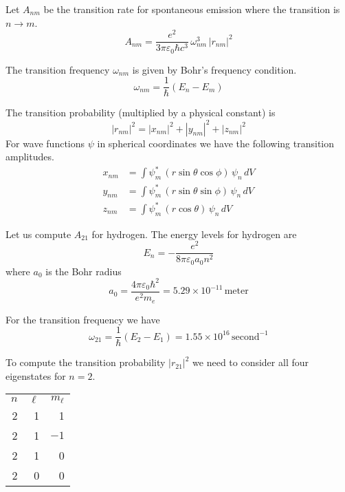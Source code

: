 \documentclass[12pt]{article}
\begin{document}
\noindent
Let $A_{nm}$ be the transition rate for spontaneous emission where the transition is $n\rightarrow m$.
\begin{equation*}
A_{nm}=\frac{e^2}{3\pi\varepsilon_0\hbar c^3}\,\omega_{nm}^3\,|r_{nm}|^2
\end{equation*}

\noindent
The transition frequency $\omega_{nm}$ is given by Bohr's frequency condition.
\begin{equation*}
\omega_{nm}=\frac{1}{\hbar}(E_n-E_m)
\end{equation*}

\noindent
The transition probability (multiplied by a physical constant) is
\begin{equation*}
|r_{nm}|^2
=|x_{nm}|^2
+|y_{nm}|^2
+|z_{nm}|^2
\end{equation*}
For wave functions $\psi$ in spherical coordinates we have the following transition amplitudes.
\begin{align*}
x_{nm}&=\int\psi_m^*\,(r\sin\theta\cos\phi)\,\psi_n\,dV
\\
y_{nm}&=\int\psi_m^*\,(r\sin\theta\sin\phi)\,\psi_n\,dV
\\
z_{nm}&=\int\psi_m^*\,(r\cos\theta)\,\psi_n\,dV
\end{align*}

\noindent
Let us compute $A_{21}$ for hydrogen.
The energy levels for hydrogen are
\begin{equation*}
E_n=-\frac{e^2}{8\pi\varepsilon_0 a_0n^2}
\end{equation*}
where $a_0$ is the Bohr radius
\begin{equation*}
a_0=\frac{4\pi\varepsilon_0\hbar^2}{e^2 m_e}
=5.29\times10^{-11}\,\text{meter}
\end{equation*}

\noindent
For the transition frequency we have
\begin{equation*}
\omega_{21}=\frac{1}{\hbar}(E_2-E_1)
=1.55\times10^{16}\,\text{second}^{-1}
\end{equation*}

\noindent
To compute the transition probability $|r_{21}|^2$ we need to
consider all four eigenstates for $n=2$.
\begin{center}
\begin{tabular}{rrr}
$n$ & $\ell$ & $m_\ell$\\
2 & 1 & 1 \\
2 & 1 & $-1$ \\
2 & 1 & 0 \\
2 & 0 & 0
\end{tabular}
\end{center}
\end{document}
